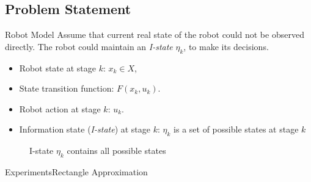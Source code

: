 \documentclass[10pt]{beamer}
\begin{document}
\subsection[Problem]{Problem Statement}
\begin{frame}{Robot Model}
Assume that current real state of the robot could not be observed directly.  The
robot could maintain an \emph{I-state} $\eta_k$, to make its decisions.
\begin{itemize}
\item Robot state at stage $k$: $x_k \in X$,
\item State transition function: $F(x_k, u_k)$.
\item Robot action at stage $k$: $u_k$.
\item Information state (\emph{I-state}) at stage $k$: $\eta_k$ is a set of
  possible states at stage $k$
\end{itemize}
\begin{figure}
  \caption{I-state $\eta_k$ contains all possible states}
  \label{fig:istate}
\end{figure}
\end{frame}

\begin{frame}{Experiments}{Rectangle Approximation}
  \begin{center}
  \end{center}
\end{frame}
\end{document}
